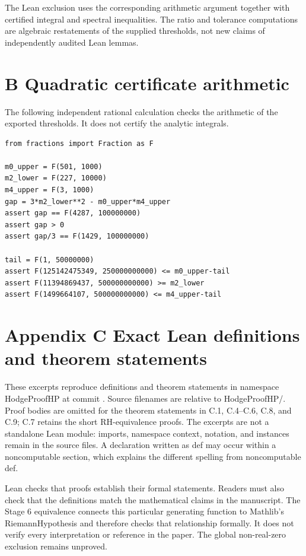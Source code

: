 \documentclass[
  11pt,
]{article}
\begin{document}
The Lean exclusion uses the corresponding arithmetic argument together with certified integral and spectral inequalities. The ratio and tolerance computations are algebraic restatements of the supplied thresholds, not new claims of independently audited Lean lemmas.

\hypertarget{b-quadratic-certificate-arithmetic}{%
\section{B Quadratic certificate arithmetic}\label{b-quadratic-certificate-arithmetic}}

The following independent rational calculation checks the arithmetic of the exported thresholds. It does not certify the analytic integrals.

\begin{verbatim}
from fractions import Fraction as F

m0_upper = F(501, 1000)
m2_lower = F(227, 10000)
m4_upper = F(3, 1000)
gap = 3*m2_lower**2 - m0_upper*m4_upper
assert gap == F(4287, 100000000)
assert gap > 0
assert gap/3 == F(1429, 100000000)

tail = F(1, 50000000)
assert F(125142475349, 250000000000) <= m0_upper-tail
assert F(11394869437, 500000000000) >= m2_lower
assert F(1499664107, 500000000000) <= m4_upper-tail
\end{verbatim}

\hypertarget{appendix-c-exact-lean-definitions-and-theorem-statements}{%
\section{Appendix C Exact Lean definitions and theorem statements}\label{appendix-c-exact-lean-definitions-and-theorem-statements}}

These excerpts reproduce definitions and theorem statements in namespace HodgeProofHP at commit . Source filenames are relative to HodgeProofHP/. Proof bodies are omitted for the theorem statements in C.1, C.4--C.6, C.8, and C.9; C.7 retains the short RH-equivalence proofs. The excerpts are not a standalone Lean module: imports, namespace context, notation, and instances remain in the source files. A declaration written as def may occur within a noncomputable section, which explains the different spelling from noncomputable def.

Lean checks that proofs establish their formal statements. Readers must also check that the definitions match the mathematical claims in the manuscript. The Stage 6 equivalence connects this particular generating function to Mathlib's RiemannHypothesis and therefore checks that relationship formally. It does not verify every interpretation or reference in the paper. The global non-real-zero exclusion remains unproved.
\end{document}
